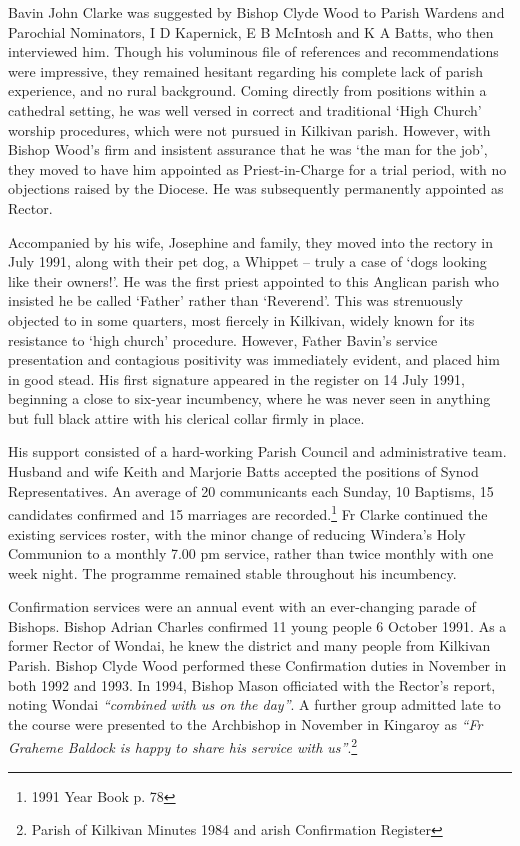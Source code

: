 Bavin John Clarke was suggested by Bishop Clyde Wood to Parish Wardens and Parochial Nominators, I D Kapernick, E B McIntosh and K A Batts, who then interviewed him. Though his voluminous file of references and recommendations were impressive, they remained hesitant regarding his complete lack of parish experience, and no rural background. Coming directly from positions within a cathedral setting, he was well versed in correct and traditional `High Church' worship procedures, which were not pursued in Kilkivan parish. However, with Bishop Wood's firm and insistent assurance that he was `the man for the job', they moved to have him appointed as Priest-in-Charge for a trial period, with no objections raised by the Diocese. He was subsequently permanently appointed as Rector.



Accompanied by his wife, Josephine and family, they moved into the rectory in July 1991, along with their pet dog, a Whippet -- truly a case of `dogs looking like their owners!'. He was the first priest appointed to this Anglican parish who insisted he be called `Father' rather than `Reverend'. This was strenuously objected to in some quarters, most fiercely in Kilkivan, widely known for its resistance to `high church' procedure. However, Father Bavin's service presentation and contagious positivity was immediately evident, and placed him in good stead. His first signature appeared in the register on 14 July 1991, beginning a close to six-year incumbency, where he was never seen in anything but full black attire with his clerical collar firmly in place.



His support consisted of a hard-working Parish Council and administrative team. Husband and wife Keith and Marjorie Batts accepted the positions of Synod Representatives. An average of 20 communicants each Sunday, 10 Baptisms, 15 candidates confirmed and 15 marriages are recorded.\footnote{1991 Year Book p. 78} Fr Clarke continued the existing services roster, with the minor change of reducing Windera's Holy Communion to a monthly 7.00 pm service, rather than twice monthly with one week night. The programme remained stable throughout his incumbency.


Confirmation services were an annual event with an ever-changing parade of Bishops. Bishop Adrian Charles confirmed 11 young people 6 October 1991. As a former Rector of Wondai, he knew the district and many people from Kilkivan Parish. Bishop Clyde Wood performed these Confirmation duties in November in both 1992 and 1993. In 1994, Bishop Mason officiated with the Rector's report, noting Wondai \emph{``combined with us on the day''}. A further group admitted late to the course were presented to the Archbishop in November in Kingaroy as \emph{``Fr Graheme Baldock is happy to share his service with us''}.\footnote{Parish of Kilkivan Minutes 1984 and arish Confirmation Register}


